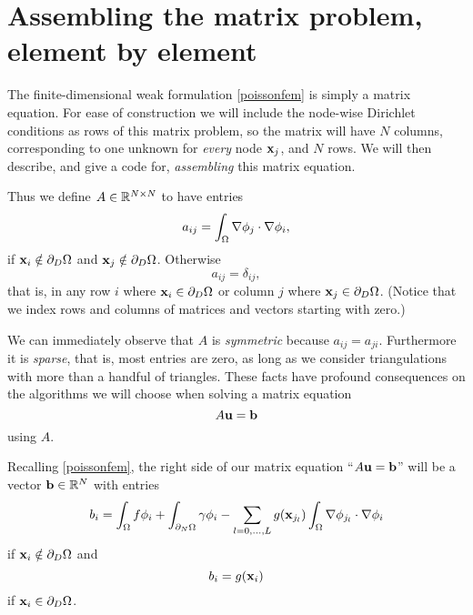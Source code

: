 \section{Assembling the matrix problem, element by element}

The finite-dimensional weak formulation \eqref{poissonfem} is simply a matrix equation.  For ease of construction we will include the node-wise Dirichlet conditions as rows of this matrix problem, so the matrix will have $N$ columns, corresponding to one unknown for \emph{every} node $\mathbf{x}_j$, and $N$ rows.  We will then describe, and give a code for, \emph{assembling} this matrix equation.

Thus we define $A \in \mathbb{R}^{N\times N}$ to have entries
\begin{equation*}
a_{ij} = \int_\Omega \nabla \phi_j \cdot \nabla \phi_i,
\end{equation*}
if $\mathbf{x}_i \notin \partial_D \Omega$ and $\mathbf{x}_j \notin \partial_D \Omega$.  Otherwise
\begin{equation*}
a_{ij} = \delta_{ij},
\end{equation*}
that is, in any row $i$ where $\mathbf{x}_i \in \partial_D \Omega$ or column $j$ where $\mathbf{x}_j \in \partial_D \Omega$.  (Notice that we index rows and columns of matrices and vectors starting with zero.)

We can immediately observe that $A$ is \emph{symmetric} because $a_{ij}=a_{ji}$.  Furthermore it is \emph{sparse}, that is, most entries are zero, as long as we consider triangulations with more than a handful of triangles.  These facts have profound consequences on the algorithms we will choose when solving a matrix equation
\begin{equation}
A \mathbf{u} = \mathbf{b} \label{poissonmatrix}
\end{equation}
using $A$.

Recalling \eqref{poissonfem}, the right side of our matrix equation ``$A \mathbf{u} = \mathbf{b}$'' will be a vector $\mathbf{b}\in\mathbb{R}^N$ with entries
    $$b_i = \int_\Omega f \phi_i + \int_{\partial_N\Omega} \gamma \phi_i - \sum_{l=0,\dots,L} g(\mathbf{x}_{j_l})  \int_\Omega \nabla \phi_{j_l} \cdot \nabla \phi_i$$
if $\mathbf{x}_i \notin \partial_D \Omega$ and
    $$b_i = g(\mathbf{x}_{i})$$
if $\mathbf{x}_i \in \partial_D \Omega$.

